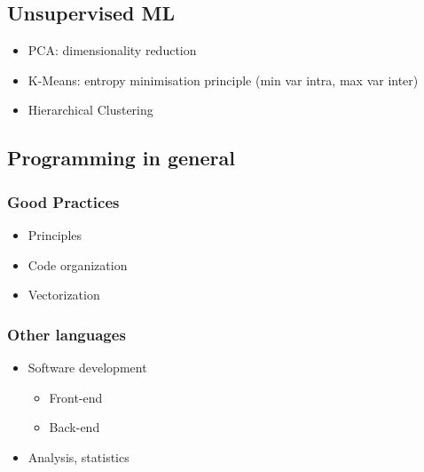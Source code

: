 \subsection{Unsupervised ML}

\begin{itemize}
   \item PCA: dimensionality reduction
   \item K-Means: entropy minimisation principle (min var intra, max var inter)
   \item Hierarchical Clustering
\end{itemize}


\subsection{Programming in general}

\subsubsection{Good Practices}

\begin{itemize}
   \item Principles
   \item Code organization
   \item Vectorization
\end{itemize}


\subsubsection{Other languages}

\begin{itemize}
   \item Software development
   \begin{itemize}
      \item Front-end
      \item Back-end
   \end{itemize}
   \item Analysis, statistics
\end{itemize}





